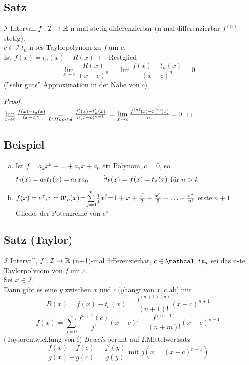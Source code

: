 \subsection{Satz}\label{sec:\thesubsection}
$\mathcal I$ Intervall $f: \mathcal I \to \mathbb{R}$ n-mal stetig differenzierbar (n-mal differenzierbar $f^{(n)}$ stetig).\\
$c \in \mathcal I\ t_n$ n-tes Taylorpolynom zu $f$ um $c$.\\
Ist $f(x) = t_n(x) + R(x)\ \leftarrow$ Restglied\\
\[\lim_{x\to c} \frac{R(x)}{(x-c)^n} = \lim \frac{f(x)-t_n(x)}{(x-c)^n} = 0 \]
(''sehr gute'' Approximation in der Nähe von $c$)
\begin{proof}~\\
$\lim\limits_{x \to c} \frac{f(x)-t_n(x)}{(x-c)^n} \underset{L'Hopital}{=} \frac{f'(x)-t_n'(x)}{n(x-c)^{n-1}}\\
\vdots\\
= \lim\limits_{x \to c} \frac{f^{(n)}(x) - t_n^{(n)}(x)}{n!} = 0$
\end{proof}
\subsection{Beispiel}
\begin{enumerate}[a)]
\item Ist $f = a_kx^k + \ldots + a_1x+ a_0$ ein Polynom, $c = 0$, so\\
$t_0(x) = a_0\\
t_1(x)  = a_1xa_0\\
\phantom{t_1(x)}\vdots\\
t_k(x) = f(x) = t_n(x)$ für $n > k$
\item $f(x) = e^x, c = 0\\
t_n(x)\!=\!\sum\limits^{n}_{j=0}\! \frac 1 j x^j\!=\!1 + x + \frac {x^2}2 + \frac{x^3}6 + \ldots + \frac {x^n}{n!}$ erste $n+1$ Glieder der Potenzreihe von $e^x$ 
\end{enumerate}
\subsection{Satz (Taylor)}\label{sec:\thesubsection}
$\mathcal{I}$ Intervall, $f : \mathcal I \to \mathbb{R}$ (n+1)-mal differenzierbar, $c \in \mathcal i\\
t_n$ sei das n-te Taylorpolynom von $f$ um $c$.\\
Sei $x \in \mathcal I$.\\
Dann gibt es eine $y$ zwischen $x$ und $c\ (y$hängt von $x,c$ ab) mit\\
\[ R(x) = f(x) - t_n(x) = \frac{f^{(n+1)(y)}}{(n+1)!}(x-c)^{n+1} \]
\[f(x)=\sum\limits^{n}_{j=0}  \frac{f^{n+1}(c)}{j!}(x-c)^j + \frac{f^{(n+1)}}{(n+m)!}(x-c)^{n+1} \]
(Taylorentwicklung von f)
{\em Beweis} beruht auf 2.Mittelwertsatz
\[ \frac{f(x) -f(c)}{g(x)-g(c)} = \frac {f'(y)}{g(y)}\text{ mit } g(x = (x-c)^{n+1}) \]
